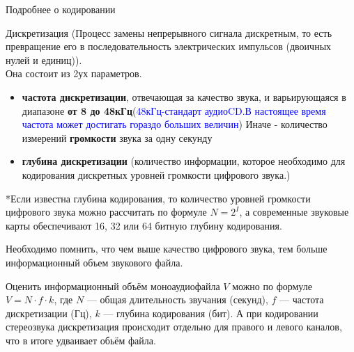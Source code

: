 \documentclass[aspectratio=169]{beamer}
\newcommand{\blu}{\textcolor{blue}}
\begin{document}
\begin{frame}[shrink=11]{Подробнее о кодировании}

 \alert{Дискретизация \scriptsize (Процесс замены непрерывного сигнала дискретным, то есть превращение его в последовательность электрических импульсов (двоичных нулей и единиц)).}\\ \footnotesize   Она состоит из 2ух параметров. 
   \begin{itemize}      
         \item  \textbf{частота дискретизации}, отвечающая за качество звука, и варьирующаяся в диапазоне \textbf{от 8 до 48кГц}(\blu{48кГц-стандарт аудиоCD.В настоящее время частота может достигать гораздо больших величин}) Иначе - количество измерений \textbf{громкости} звука за одну секунду
         \item  \textbf{глубина дискретизации} (количество информации, которое необходимо для кодирования дискретных уровней громкости цифрового звука.)
    \end{itemize}
    *Если известна глубина кодирования, то количество уровней громкости цифрового звука можно рассчитать по формуле $N = 2^I$, а современные звуковые карты обеспечивают  16, 32 или  64 битную глубину кодирования.

\vspace{10pt}

    Необходимо помнить, что чем выше качество цифрового звука, тем больше информационный объем звукового файла.
    
    
Оценить информационный объём \alert{моно}аудиофайла $V$ можно по формуле \alert{$V=N\cdot f\cdot k$}, где  $N$  — общая длительность звучания (секунд),  $f$  — частота дискретизации (Гц),  $k$  — глубина кодирования (бит). А при кодировании \alert{стерео}звука дискретизация происходит отдельно для правого и левого каналов, что в итоге \alert{удваивает} обьём файла.
    
\end{frame}
\end{document}

